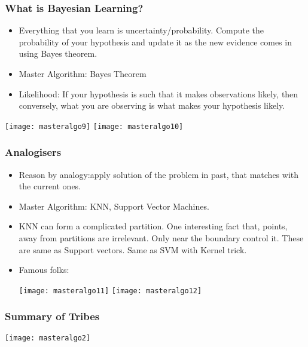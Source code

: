 \begin{frame}[fragile]\frametitle{What is Bayesian Learning?}
  \begin{itemize}
	    \item Everything that you learn is uncertainty/probability. Compute the probability of your hypothesis and update it as the new evidence comes in using Bayes theorem.
\item Master Algorithm:	Bayes Theorem
\item Likelihood: If your hypothesis is such that it makes observations likely, then conversely, what you are observing is what makes your hypothesis likely.

  \end{itemize}

	 \begin{center}
\texttt{[image: masteralgo9]}
\texttt{[image: masteralgo10]}
\end{center}
  
\end{frame}

\begin{frame}[fragile]\frametitle{Analogisers}
  \begin{itemize}
    \item Reason by analogy:apply solution of the problem in past, that matches with the current ones.
	\item Master Algorithm: KNN, Support Vector Machines.
	\item KNN can form a complicated partition. One interesting fact that, points, away from partitions are irrelevant. Only near the boundary control it. These are same as Support vectors. Same as SVM with Kernel trick.
	\item Famous folks:
	
	 \begin{center}
\texttt{[image: masteralgo11]}
\texttt{[image: masteralgo12]}

\end{center}		
  \end{itemize}

\end{frame}


\begin{frame}[fragile]\frametitle{Summary of Tribes}
 
 \begin{center}
\texttt{[image: masteralgo2]}
\end{center}
\end{frame}


